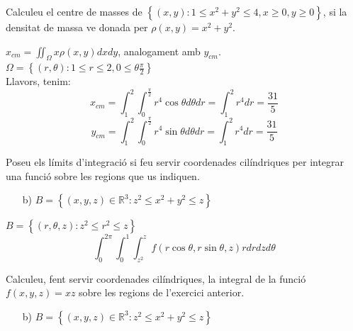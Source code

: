 \documentclass[a4paper, 12pt]{article}
\begin{document}
    \setcounter{numex}{77}
    \begin{exercici}
        Calculeu el centre de masses de $\left\{\left(x,y\right): 1\leq x^2+y^2 \leq 4, x\geq0, y \geq 0\right\}$, si la densitat de massa ve donada per $\rho\left(x,y\right) = x^2+y^2$.
    \end{exercici}
    
    \begin{solucio}
        $x_{cm} = \iint_\Omega x\rho\left(x,y\right)dxdy$, analogament amb $y_{cm}$.\\
        $\Omega = \left\{\left(r, \theta\right): 1\leq r \leq 2, 0 \leq \theta \frac{\pi}{2}\right\}$\\
        Llavors, tenim:
        $$x_{cm} = \int_{1}^{2}\int_{0}^{\frac{\pi}{2}} r^4\cos{\theta}d\theta dr = \int_{1}^{2} r^4 dr = \frac{31}{5}$$
        $$y_{cm} = \int_{1}^{2}\int_{0}^{\frac{\pi}{2}} r^4\sin{\theta}d\theta dr = \int_{1}^{2} r^4 dr = \frac{31}{5}$$

    \end{solucio}

    \begin{exercici}
        Poseu els límits d'integració si feu servir coordenades cilíndriques per integrar una funció
        sobre les regions que us indiquen.
        \begin{itemize}
            \item[b)] $B = \left\{\left(x,y,z\right)\in\mathbb{R}^3 : z^2\leq x^2+y^2\leq z\right\}$
        \end{itemize}
    \end{exercici}

    \begin{solucio}
        $B = \left\{\left(r, \theta, z\right): z^2 \leq r^2 \leq z\right\}$
        $$\int_{0}^{2\pi}\int_{0}^{1}\int_{z^2}^{z} f(r\cos{\theta}, r\sin{\theta}, z)r dr dz d\theta$$
    \end{solucio}
    
    \begin{exercici}
        Calculeu, fent servir coordenades cilíndriques, la integral de la funció $f\left(x,y,z\right) = xz$ sobre les regions de l'exercici anterior.
        \begin{itemize}
            \item[b)] $B = \left\{\left(x,y,z\right)\in\mathbb{R}^3 : z^2\leq x^2+y^2\leq z\right\}$
        \end{itemize}
    \end{exercici}
\end{document}

